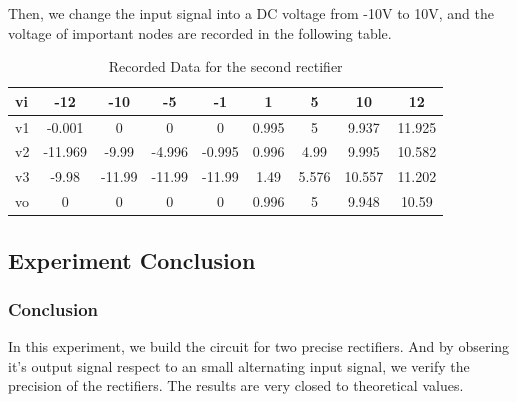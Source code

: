\begin{itemize}
        Then, we change the input signal into a DC voltage from -10V to 10V, and the voltage of important nodes are recorded in the following table.
        \begin{table}[H]
            \centering
            \begin{tabular}{l|cccccccc}
                \toprule
                vi & -12     & -10    & -5     & -1     & 1     & 5     & 10     & 12     \\
                \midrule
                v1 & -0.001  & 0      & 0      & 0      & 0.995 & 5     & 9.937  & 11.925 \\
                v2 & -11.969 & -9.99  & -4.996 & -0.995 & 0.996 & 4.99  & 9.995  & 10.582 \\
                v3 & -9.98   & -11.99 & -11.99 & -11.99 & 1.49  & 5.576 & 10.557 & 11.202 \\
                vo & 0       & 0      & 0      & 0      & 0.996 & 5     & 9.948  & 10.59  \\
                \bottomrule
            \end{tabular}
            \caption{Recorded Data for the second rectifier}
            \label{tab:12b}
        \end{table}
    \end{itemize}

\subsection{Experiment Conclusion}
    \subsubsection{Conclusion}
    In this experiment, we build the circuit for two precise rectifiers. And by obsering it's output signal respect to an small alternating input signal, we verify the precision of the rectifiers. The results are very closed to theoretical values.